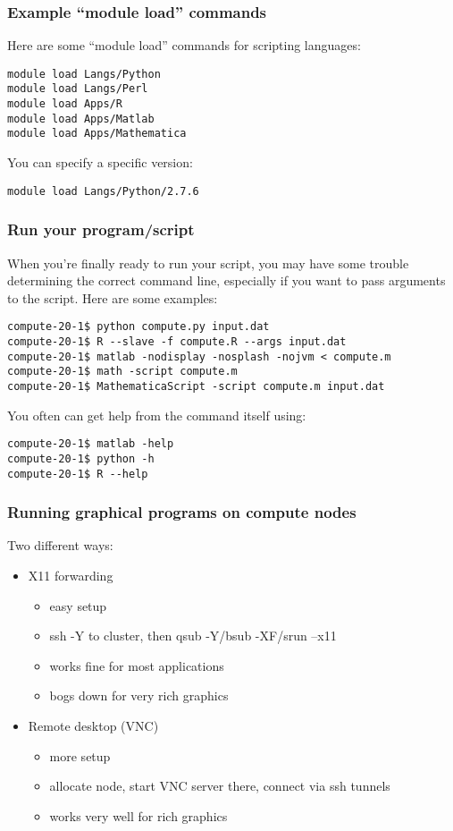 \documentclass[10pt]{beamer}
\begin{document}
\begin{frame}[fragile]
\frametitle{Example ``module load'' commands}
Here are some ``module load'' commands for scripting languages:

\begin{verbatim}
module load Langs/Python
module load Langs/Perl
module load Apps/R
module load Apps/Matlab
module load Apps/Mathematica
\end{verbatim}

You can specify a specific version:
\begin{verbatim}
module load Langs/Python/2.7.6
\end{verbatim}

\end{frame}

\begin{frame}[fragile]
\frametitle{Run your program/script}
When you're finally ready to run your script, you may have some
trouble determining the correct command line, especially if you want to
pass arguments to the script.  Here are some examples:

\begin{verbatim}
compute-20-1$ python compute.py input.dat
compute-20-1$ R --slave -f compute.R --args input.dat
compute-20-1$ matlab -nodisplay -nosplash -nojvm < compute.m
compute-20-1$ math -script compute.m
compute-20-1$ MathematicaScript -script compute.m input.dat
\end{verbatim}

You often can get help from the command itself using:

\begin{verbatim}
compute-20-1$ matlab -help
compute-20-1$ python -h
compute-20-1$ R --help
\end{verbatim}
\end{frame}

\begin{frame}[fragile]
\frametitle{Running graphical programs on compute nodes}
Two different ways:
\begin{itemize}
\item X11 forwarding
\begin{itemize}
\item easy setup
\item ssh -Y to cluster, then qsub -Y/bsub -XF/srun --x11
\item works fine for most applications
\item bogs down for very rich graphics
\end{itemize}
\item Remote desktop (VNC)
\begin{itemize}
\item more setup
\item allocate node, start VNC server there, connect via ssh tunnels
\item works very well for rich graphics
\end{itemize}
\end{itemize}
\end{frame}
\end{document}
